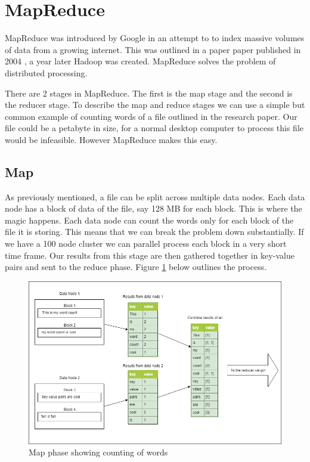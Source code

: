 \section{MapReduce}

MapReduce was introduced by Google in an attempt to to index massive volumes of data from a growing internet. This was outlined in a paper paper published in 2004 \cite{mapreduce}, a year later Hadoop was created. MapReduce solves the problem of distributed processing.

There are 2 stages in MapReduce. The first is the map stage and the second is the reducer stage. To describe the map and reduce stages we can use a simple but common example of counting words of a file outlined in the research paper\cite{mapreduce}. Our file could be a petabyte in size, for a normal desktop computer to process this file would be infeasible. However MapReduce makes this easy.

\subsection{Map}

As previously mentioned, a file can be split across multiple data nodes. Each data node has a block of data of the file, say 128 MB for each block. This is where the magic happens. Each data node can count the words only for each block of the file it is storing. This means that we can break the problem down substantially. If we have a 100 node cluster we can parallel process each block in a very short time frame. Our results from this stage are then gathered together in key-value pairs and sent to the reduce phase. Figure \ref{fig:map-phase} below outlines the process.

\begin{figure}[H]
  \includegraphics[width=\linewidth]{./images/map-phase.png}
  \caption{Map phase showing counting of words}
  \label{fig:map-phase}
\end{figure}

